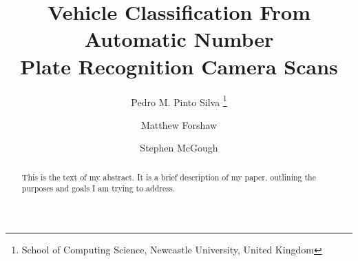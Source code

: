 \documentclass[twoside,leqno,twocolumn]{article}
\begin{document}

\title{\Large Vehicle Classification From Automatic Number \\ Plate Recognition Camera Scans}
\author{Pedro M. Pinto Silva \thanks{School of Computing Science, Newcastle University, United Kingdom}
\and
Matthew Forshaw\footnotemark[1]
\and
Stephen McGough\footnotemark[1]}
\date{}

\maketitle








\begin{abstract} \small\baselineskip=9pt This is the text of my abstract. It is a brief
description of my
paper, outlining the purposes and goals I am trying to address.\end{abstract}







\end{document}
